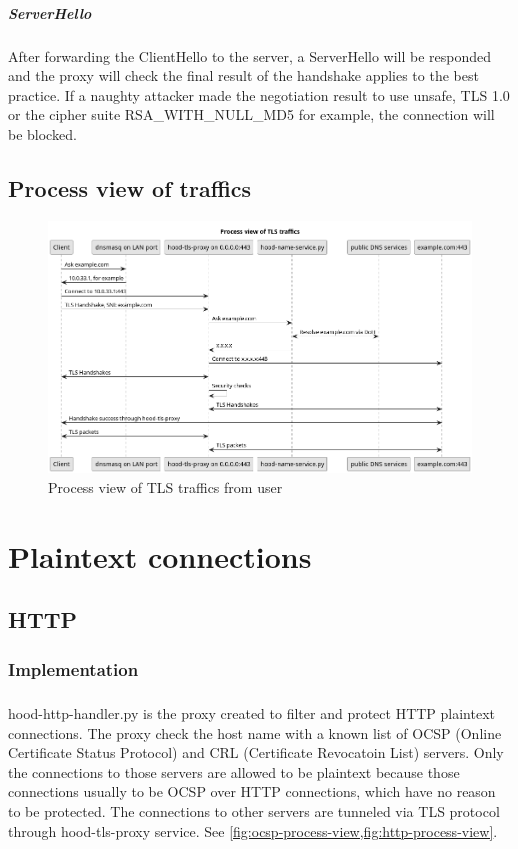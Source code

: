 \documentclass[mscthesis]{usiinfthesis}
\begin{document}
\paragraph{ServerHello} After forwarding the ClientHello to the server, a ServerHello will be responded and the proxy will check the final result of the handshake applies to the best practice. If a naughty attacker made the negotiation result to use unsafe, TLS 1.0 or the cipher suite RSA\_WITH\_NULL\_MD5 for example, the connection will be blocked.


\section{Process view of traffics}
\begin{figure}[H]
  \includegraphics[width=\textheight, angle=90]{graphics/puml/process-tls-traffic.png}
  \caption{Process view of TLS traffics from user}
  \label{fig:tls-process-view}
\end{figure}

\chapter{Plaintext connections}

\section{HTTP}
\subsection{Implementation}
\paragraph{}
hood-http-handler.py is the proxy created to filter and protect HTTP plaintext connections. The proxy check the host name with a known list of OCSP (Online Certificate Status Protocol) and CRL (Certificate Revocatoin List) servers. Only the connections to those servers are allowed to be plaintext because those connections usually to be OCSP over HTTP connections, which have no reason to be protected. The connections to other servers are tunneled via TLS protocol through hood-tls-proxy service. See \cref{fig:ocsp-process-view,fig:http-process-view}.
\end{document}
